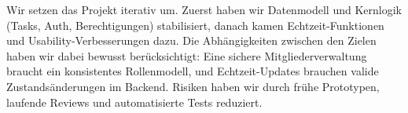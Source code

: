 
Wir setzen das Projekt iterativ um.
Zuerst haben wir Datenmodell und Kernlogik (Tasks, Auth, Berechtigungen)
stabilisiert, danach kamen Echtzeit-Funktionen und Usability-Verbesserungen dazu.
Die Abhängigkeiten zwischen den Zielen haben wir dabei bewusst berücksichtigt:
Eine sichere Mitgliederverwaltung braucht ein konsistentes Rollenmodell,
und Echtzeit-Updates brauchen valide Zustandsänderungen im Backend.
Risiken haben wir durch frühe Prototypen, laufende Reviews und automatisierte
Tests reduziert.
